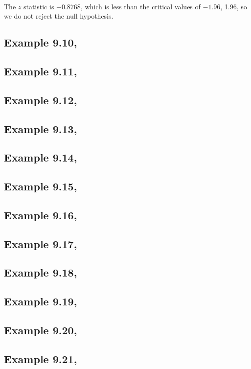 \documentclass{article}\usepackage[]{graphicx}\usepackage[]{color}
\begin{document}
\paragraph{}The $z$ statistic is \ensuremath{-0.8768}, which is less than the critical values of \ensuremath{-1.96}, 1.96, so we do not reject the null hypothesis.

\subsection{Example 9.10, }
\subsection{Example 9.11, }
\subsection{Example 9.12, }
\subsection{Example 9.13, }
\subsection{Example 9.14, }
\subsection{Example 9.15, }
\subsection{Example 9.16, }
\subsection{Example 9.17, }
\subsection{Example 9.18, }
\subsection{Example 9.19, }
\subsection{Example 9.20, }
\subsection{Example 9.21, }
\end{document}

